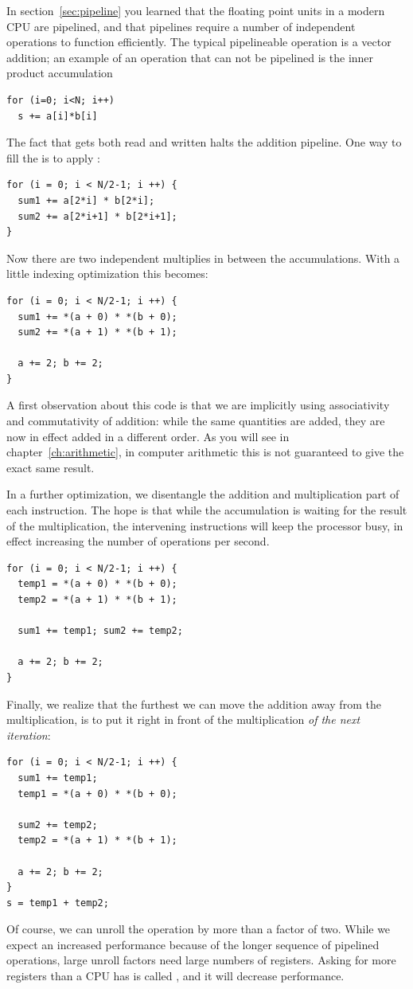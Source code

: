 In section~\ref{sec:pipeline} you learned that the floating point
units in a modern CPU are pipelined, and that pipelines require a
number of independent operations to function efficiently. The typical
pipelineable operation is a vector addition; an example of an
operation that can not be pipelined is the inner product accumulation
\begin{verbatim}
for (i=0; i<N; i++)
  s += a[i]*b[i]
\end{verbatim}
The fact that  gets both read and written halts the addition
pipeline. One way to fill the 
is to apply :
\begin{verbatim}
for (i = 0; i < N/2-1; i ++) {
  sum1 += a[2*i] * b[2*i];
  sum2 += a[2*i+1] * b[2*i+1];
}
\end{verbatim}
Now there are two independent multiplies in between the accumulations.
With a little indexing optimization this becomes:
\begin{verbatim}
for (i = 0; i < N/2-1; i ++) {
  sum1 += *(a + 0) * *(b + 0);
  sum2 += *(a + 1) * *(b + 1);

  a += 2; b += 2;
}
\end{verbatim}
A first observation about this code is that we are implicitly using
associativity and commutativity of addition: while the same quantities
are added, they are now in effect added in a different order. As you
will see in chapter~\ref{ch:arithmetic}, in computer arithmetic
this is not guaranteed to
give the exact same result. 

In a further optimization, we disentangle the addition and
multiplication part of each instruction. The hope is that while the
accumulation is waiting for the result of the multiplication, the
intervening instructions will keep the processor busy, in effect
increasing the number of operations per second.
\begin{verbatim}
for (i = 0; i < N/2-1; i ++) {
  temp1 = *(a + 0) * *(b + 0);
  temp2 = *(a + 1) * *(b + 1);

  sum1 += temp1; sum2 += temp2;

  a += 2; b += 2;
}
\end{verbatim}
Finally, we realize that the furthest we can move the addition away
from the multiplication, is to put it right in front of the
multiplication \emph{of the next iteration}:
\begin{verbatim}
for (i = 0; i < N/2-1; i ++) {
  sum1 += temp1;
  temp1 = *(a + 0) * *(b + 0);

  sum2 += temp2;
  temp2 = *(a + 1) * *(b + 1);

  a += 2; b += 2;
}
s = temp1 + temp2;
\end{verbatim}
Of course, we can unroll the operation by more than a factor of
two. While we expect an increased performance because of the longer
sequence of pipelined operations, large unroll factors
need large numbers of registers. Asking for more registers than a CPU
has is called , and it will decrease
performance.


